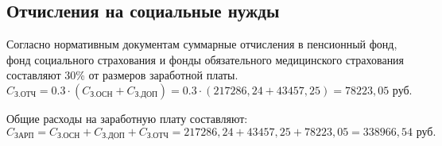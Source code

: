 \subsection{Отчисления на социальные нужды} \label{social_fee}

Согласно нормативным документам суммарные отчисления в  пенсионный фонд, фонд социального страхования и фонды обязательного медицинского страхования составляют 30\% от размеров заработной платы.
\begin{equation}
  \label{eq:salary_taxes}
C_\textrm{З.ОТЧ} = 0.3 \cdot (C_\textrm{З.ОСН} + C_\textrm{З.ДОП}) = 0.3 \cdot (217286,24 + 43457,25) = 78223,05 \textrm{ руб.}
\end{equation}

Общие расходы на заработную плату составляют:
\begin{equation}
  \label{eq:salary_sum}
C_\textrm{ЗАРП} = C_\textrm{З.ОСН} + C_\textrm{З.ДОП} + C_\textrm{З.ОТЧ} = 217286,24 + 43457,25 + 78223,05 =  338966,54 \textrm{ руб.}
\end{equation}